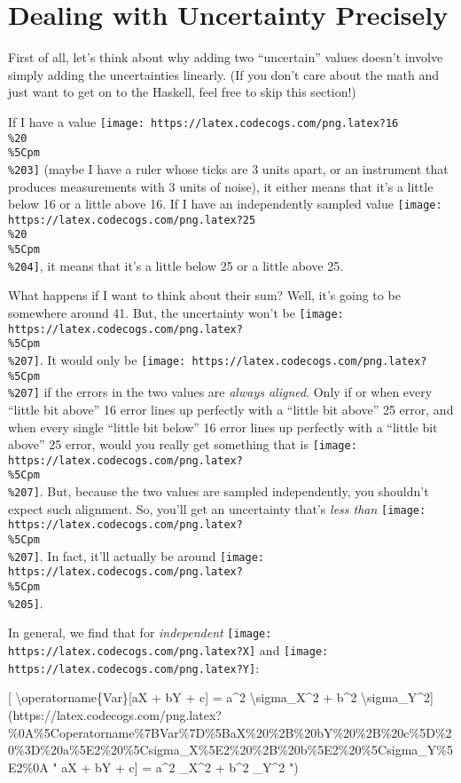 \documentclass[]{article}
\begin{document}
\hypertarget{dealing-with-uncertainty-precisely}{%
\section{Dealing with Uncertainty
Precisely}\label{dealing-with-uncertainty-precisely}}

First of all, let's think about why adding two ``uncertain'' values doesn't
involve simply adding the uncertainties linearly. (If you don't care about the
math and just want to get on to the Haskell, feel free to skip this section!)

If I have a value
\texttt{[image: https://latex.codecogs.com/png.latex?16\\\%20\\\%5Cpm\\\%203]} (maybe
I have a ruler whose ticks are 3 units apart, or an instrument that produces
measurements with 3 units of noise), it either means that it's a little below 16
or a little above 16. If I have an independently sampled value
\texttt{[image: https://latex.codecogs.com/png.latex?25\\\%20\\\%5Cpm\\\%204]}, it
means that it's a little below 25 or a little above 25.

What happens if I want to think about their sum? Well, it's going to be
somewhere around 41. But, the uncertainty won't be
\texttt{[image: https://latex.codecogs.com/png.latex?\\\%5Cpm\\\%207]}. It would
only be \texttt{[image: https://latex.codecogs.com/png.latex?\\\%5Cpm\\\%207]} if
the errors in the two values are \emph{always aligned}. Only if or when every
``little bit above'' 16 error lines up perfectly with a ``little bit above'' 25
error, and when every single ``little bit below'' 16 error lines up perfectly
with a ``little bit above'' 25 error, would you really get something that is
\texttt{[image: https://latex.codecogs.com/png.latex?\\\%5Cpm\\\%207]}. But, because
the two values are sampled independently, you shouldn't expect such alignment.
So, you'll get an uncertainty that's \emph{less than}
\texttt{[image: https://latex.codecogs.com/png.latex?\\\%5Cpm\\\%207]}. In fact,
it'll actually be around
\texttt{[image: https://latex.codecogs.com/png.latex?\\\%5Cpm\\\%205]}.

In general, we find that for \emph{independent}
\texttt{[image: https://latex.codecogs.com/png.latex?X]} and
\texttt{[image: https://latex.codecogs.com/png.latex?Y]}:

{[} \textbackslash operatorname\{Var\}{[}aX + bY + c{]} = a\^{}2
\textbackslash sigma\_X\^{}2 + b\^{}2
\textbackslash sigma\_Y\^{}2{]}(https://latex.codecogs.com/png.latex?\%0A\%5Coperatorname\%7BVar\%7D\%5BaX\%20\%2B\%20bY\%20\%2B\%20c\%5D\%20\%3D\%20a\%5E2\%20\%5Csigma\_X\%5E2\%20\%2B\%20b\%5E2\%20\%5Csigma\_Y\%5E2\%0A
" \operatorname{Var}{[}aX + bY + c{]} = a\^{}2 \sigma\_X\^{}2 + b\^{}2
\sigma\_Y\^{}2 ")
\end{document}
